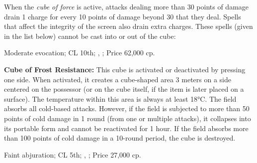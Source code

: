When the \emph{cube of force} is active, attacks dealing more than 30 points of damage drain 1 charge for every 10 points of damage beyond 30 that they deal. Spells that affect the integrity of the screen also drain extra charges. These spells (given in the list below) cannot be cast into or out of the cube:



Moderate evocation; CL 10th; , ; Price 62,000 cp.



\textbf{Cube of Frost Resistance:} This cube is activated or deactivated by pressing one side. When activated, it creates a cube-shaped area 3 meters on a side centered on the possessor (or on the cube itself, if the item is later placed on a surface). The temperature within this area is always at least 18°C. The field absorbs all cold-based attacks. However, if the field is subjected to more than 50 points of cold damage in 1 round (from one or multiple attacks), it collapses into its portable form and cannot be reactivated for 1 hour. If the field absorbs more than 100 points of cold damage in a 10-round period, the cube is destroyed.

Faint abjuration; CL 5th; , ; Price 27,000 cp.




